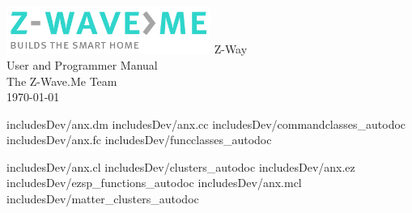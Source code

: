 \documentclass[10pt, pointlessnumbers, twoside=false, normalheadings]{scrbook}
\begin{document}
\begin{titlepage}
\begin{center}
	\includegraphics[width=0.5\textwidth]{pngs/z-wave.me-logo.png}
	\vspace{10mm}
	\Huge{Z-Way}\\
	\vspace{10mm}
	\LARGE{User and Programmer Manual}\\
	\vspace{\fill}	
	\large{The Z-Wave.Me Team}\\
	\large{\today}
\end{center}
\end{titlepage}
		

\newpage{}
\tableofcontents
 
 
 
 
 
 
 







\begin{appendix} 
 {includesDev/anx.dm}
 {includesDev/anx.cc}
 {includesDev/commandclasses_autodoc}
 {includesDev/anx.fc}
 {includesDev/funcclasses_autodoc}
 
 {includesDev/anx.cl}
 {includesDev/clusters_autodoc}
 {includesDev/anx.ez}
 {includesDev/ezsp_functions_autodoc}
 {includesDev/anx.mcl}
 {includesDev/matter_clusters_autodoc}
\end{appendix} 

\listoftables
\listoffigures
\printindex
\end{document}
